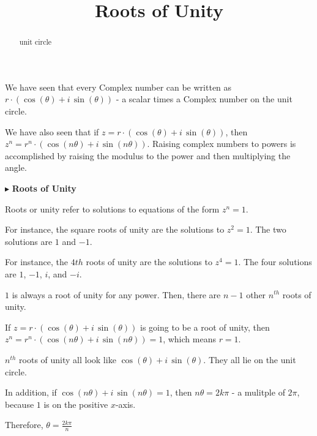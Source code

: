 \documentclass{ximera}
\title{Roots of Unity}
\begin{document}
\begin{abstract}
unit circle
\end{abstract}
\maketitle




We have seen that every Complex number can be written as $r \cdot (\cos(\theta) + i \, \sin(\theta))$ - a scalar times a Complex number on the unit circle.

We have also seen that if $z = r \cdot (\cos(\theta) + i \, \sin(\theta))$, then $z^n = r^n \cdot (\cos(n\theta) + i \, \sin(n\theta))$. Raising complex numbers to powers is accomplished by raising the modulus to the power and then multiplying the angle.


$\blacktriangleright$  \textbf{Roots of Unity}

Roots or unity refer to solutions to equations of the form $z^n = 1$.




For instance, the square roots of unity are the solutions to $z^2 = 1$.  The two solutions are $1$ and $-1$.


For instance, the $4{th}$ roots of unity are the solutions to $z^4 = 1$.  The four solutions are $1$, $-1$, $i$, and $-i$.




$1$ is always a root of unity for any power. Then, there are $n-1$ other $n^{th}$ roots of unity.



If $z = r \cdot (\cos(\theta) + i \, \sin(\theta))$ is going to be a root of unity, then $z^n = r^n \cdot (\cos(n\theta) + i \, \sin(n\theta)) = 1$, which means $r=1$.

$n^{th}$ roots of unity all look like $\cos(\theta) + i \, \sin(\theta)$.  They all lie on the unit circle.



In addition, if $\cos(n\theta) + i \, \sin(n\theta) = 1$, then $n \theta = 2 k \pi$ - a mulitple of $2 \pi$, because $1$ is on the positive $x$-axis.


Therefore, $\theta = \frac{2 k \pi}{n}$  
\end{document}

